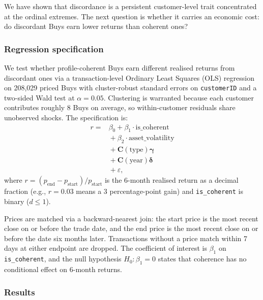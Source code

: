 We have shown that discordance is a persistent customer-level trait concentrated at the ordinal extremes. The next question is whether it carries an economic cost: do discordant Buys earn lower returns than coherent ones?

\subsubsection{Regression specification}
We test whether profile-coherent Buys earn different realised returns from discordant ones via a transaction-level Ordinary Least Squares (OLS) regression on 208{,}029 priced Buys with cluster-robust standard errors on \texttt{customerID} and a two-sided Wald test at $\alpha = 0.05$. Clustering is warranted because each customer contributes roughly 8 Buys on average, so within-customer residuals share unobserved shocks. The specification is:
\begin{equation}
\label{eq:return-premium-ols}
\begin{split}
r ={}& \beta_0 + \beta_1 \cdot \text{is\_coherent} \\
    &{}+ \beta_2 \cdot \text{asset\_volatility} \\
    &{}+ \mathbf{C}(\text{type})\boldsymbol{\gamma} \\
    &{}+ \mathbf{C}(\text{year})\boldsymbol{\delta} \\
    &{}+ \varepsilon,
\end{split}
\end{equation}
where $r = (p_{\text{end}} - p_{\text{start}})/p_{\text{start}}$ is the 6-month realised return as a decimal fraction (e.g., $r = 0.03$ means a 3 percentage-point gain) and \texttt{is\_coherent} is binary ($d \leq 1$).

Prices are matched via a backward-nearest join: the start price is the most recent close on or before the trade date, and the end price is the most recent close on or before the date six months later. Transactions without a price match within 7 days at either endpoint are dropped. The coefficient of interest is $\beta_1$ on \texttt{is\_coherent}, and the null hypothesis $H_0\colon \beta_1 = 0$ states that coherence has no conditional effect on 6-month returns.

\subsubsection{Results}


